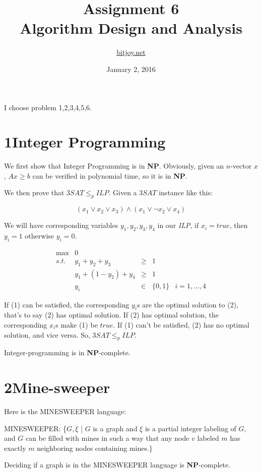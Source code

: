\documentclass[a4paper,12pt]{article}
\title{Assignment 6\\Algorithm Design and Analysis}
\author{\href{http://bitjoy.net}{bitjoy.net}}
\date{January 2, 2016}
\begin{document}
\maketitle

I choose problem 1,2,3,4,5,6.

\section*{1\quad Integer Programming}

We first show that Integer Programming is in \textbf{NP}. Obviously, given an $n$-vector $x$, $Ax\geq b$ can be verified in polynomial time, so it is in \textbf{NP}.

We then prove that $3SAT\leq_p ILP$. Given a $3SAT$ instance like this:

\[
(x_1\vee x_2 \vee x_3)\land(x_1\vee \lnot x_2\vee x_4)\tag{1}
\]

We will have corresponding variables $y_1,y_2,y_3,y_4$ in our \emph{ILP}, if $x_i=true$, then $y_i=1$ otherwise $y_i=0$.

\[
\begin{array}{rrrcl}
 \max & 0&   \\
 s.t. & y_1+y_2+y_3 &\geq & 1 &  \\ \tag{2}
      & y_1+(1-y_2)+y_4 &\geq & 1 & \\
      & y_i &\in & \{0,1\}& i=1,...,4
\end{array} \nonumber
\]

If (1) can be satisfied, the corresponding $y_i$s are the optimal solution to (2), that's to say (2) has optimal solution. If (2) has optimal solution, the corresponding $x_i$s make (1) be $true$. If (1) can't be satisfied, (2) has no optimal solution, and vice versa. So, $3SAT\leq_p ILP$.

Integer-programming is in \textbf{NP}-complete.

\section*{2\quad Mine-sweeper}
Here is the MINESWEEPER language:

MINESWEEPER: \{$G,\xi$ | $G$ is a graph and $\xi$ is a partial integer labeling of $G$, and $G$ can be filled with mines in such a way that any node $v$ labeled $m$ has exactly $m$ neighboring nodes containing mines.\}

Deciding if a graph is in the MINESWEEPER language is \textbf{NP}-complete.
\end{document}
